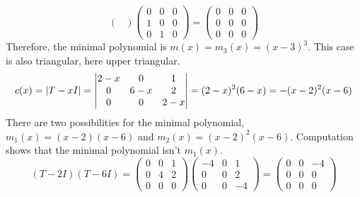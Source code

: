\begin{exercises}
\begin{answer}
\begin{exparts}
\begin{equation*}
\begin{pmatrix}
          \end{pmatrix}
          \begin{pmatrix}
            0  &0  &0  \\
            1  &0  &0  \\
            0  &1  &0
          \end{pmatrix}
          =          
          \begin{pmatrix}
            0  &0  &0  \\
            0  &0  &0  \\
            0  &0  &0
          \end{pmatrix}
        \end{equation*}
        Therefore, the minimal polynomial is $m(x)=m_3(x)=(x-3)^3$.
       \partsitem This case is also triangular, here upper triangular.
         \begin{equation*}
           c(x)=\deter{T-xI}=
           \begin{vmatrix}
             2-x  &0   &1     \\
             0    &6-x &2     \\
             0    &0   &2-x
           \end{vmatrix}
           =(2-x)^2(6-x)=-(x-2)^2(x-6)
         \end{equation*}
         There are two possibilities for the minimal polynomial,
         $m_1(x)=(x-2)(x-6)$ and $m_2(x)=(x-2)^2(x-6)$.
         Computation shows that the minimal polynomial isn't $m_1(x)$.
         \begin{equation*}
           (T-2I)(T-6I)=
           \begin{pmatrix}
             0  &0  &1  \\
             0  &4  &2  \\
             0  &0  &0  
           \end{pmatrix}
           \begin{pmatrix}
             -4  &0  &1  \\
              0  &0  &2  \\
              0  &0  &-4
           \end{pmatrix}
           =
           \begin{pmatrix}
             0  &0  &-4  \\
             0  &0  &0   \\
             0  &0  &0
           \end{pmatrix}
         \end{equation*}

\end{exparts}
\end{answer}
\end{exercises}
